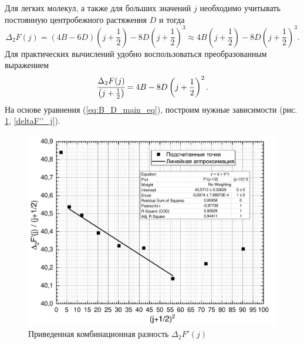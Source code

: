 Для легких молекул, а также для больших значений $j$ необходимо учитывать постоянную центробежного растяжения $D$ и тогда
\begin{equation}
\Delta_2F(j)=(4B-6D)\left(j+\frac{1}{2}\right)-8D\left(j+\frac{1}{2}\right)^3\approx4B\left(j+\frac{1}{2}\right)-8D\left(j+\frac{1}{2}\right)^3.
\end{equation}
Для практических вычислений удобно воспользоваться преобразованным выражением 
\begin{equation}
\cfrac{\Delta_2F(j)}{\left(j+\frac{1}{2}\right)}=4B-8D\left(j+\frac{1}{2}\right)^2.
\label{eq:B_D_main_eq}
\end{equation}
На основе уравнения (\ref{eq:B_D_main_eq}), построим нужные зависимости (рис. \ref{deltaF'_j}, \ref{deltaF''_j}).
\begin{figure}[H]
	\vspace{-0.5cm}
	\centering
	\includegraphics[height=0.49\textheight]{data/delta_F'_j_sq}
	\vspace{-0.5cm}
	\caption{Приведенная комбинационная разность $\Delta_2F'(j)$}
	\label{deltaF'_j}
\end{figure}
